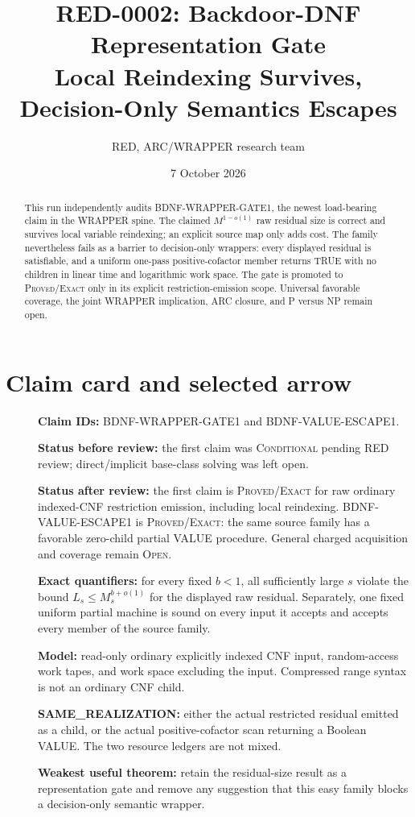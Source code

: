 \documentclass[11pt]{article}
\title{RED-0002: Backdoor-DNF Representation Gate\\
Local Reindexing Survives, Decision-Only Semantics Escapes}
\author{RED, ARC/WRAPPER research team}
\date{7 October 2026}
\begin{document}
\maketitle

\begin{abstract}
This run independently audits BDNF-WRAPPER-GATE1, the newest load-bearing
claim in the WRAPPER spine.  The claimed $M^{1-o(1)}$ raw residual size is
correct and survives local variable reindexing; an explicit source map only
adds cost.  The family nevertheless fails as a barrier to decision-only
wrappers: every displayed residual is satisfiable, and a uniform one-pass
positive-cofactor member returns TRUE with no children in linear time and
logarithmic work space.  The gate is promoted to \textsc{Proved/Exact} only
in its explicit restriction-emission scope.  Universal favorable coverage,
the joint WRAPPER implication, ARC closure, and P versus NP remain open.
\end{abstract}

\section{Claim card and selected arrow}
\begin{description}
\item[] \textbf{Claim IDs:} BDNF-WRAPPER-GATE1 and
BDNF-VALUE-ESCAPE1.
\item[] \textbf{Status before review:} the first claim was
\textsc{Conditional} pending RED review; direct/implicit base-class solving
was left open.
\item[] \textbf{Status after review:} the first claim is
\textsc{Proved/Exact} for raw ordinary indexed-CNF restriction emission,
including local reindexing.  BDNF-VALUE-ESCAPE1 is
\textsc{Proved/Exact}: the same source family has a favorable zero-child
partial VALUE procedure.  General charged acquisition and coverage remain
\textsc{Open}.
\item[] \textbf{Exact quantifiers:} for every fixed $b<1$, all sufficiently
large $s$ violate the bound $L_s\le M_s^{b+o(1)}$ for the displayed raw
residual.  Separately, one fixed uniform partial machine is sound on every
input it accepts and accepts every member of the source family.
\item[] \textbf{Model:} read-only ordinary explicitly indexed CNF input,
random-access work tapes, and work space excluding the input.  Compressed
range syntax is not an ordinary CNF child.
\item[] \textbf{SAME\_REALIZATION:} either the actual restricted residual
emitted as a child, or the actual positive-cofactor scan returning a Boolean
VALUE.  The two resource ledgers are not mixed.
\item[] \textbf{Weakest useful theorem:} retain the residual-size result as
a representation gate and remove any suggestion that this easy family
blocks a decision-only semantic wrapper.
\end{description}
\end{document}
